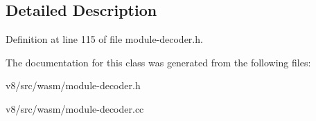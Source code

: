 \subsection{Detailed Description}


Definition at line 115 of file module-\/decoder.\+h.



The documentation for this class was generated from the following files\+:\begin{DoxyCompactItemize}
\item 
v8/src/wasm/module-\/decoder.\+h\item 
v8/src/wasm/module-\/decoder.\+cc\end{DoxyCompactItemize}
